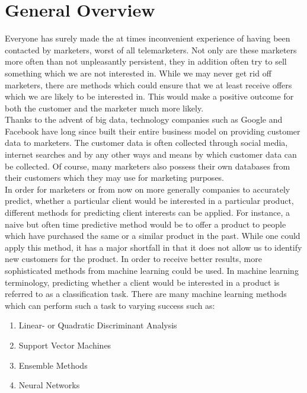 	
	\section{General Overview}

	Everyone has surely made the at times inconvenient experience of having been contacted by marketers, worst of all telemarketers. Not only are these
	marketers more often than not unpleasantly persistent, they in addition often try to sell something which we are not interested in. While we may 
	never get rid off marketers, there are methods which could ensure that we at least receive offers which we are likely to be interested in. This 
	would make a positive outcome for both the customer and the marketer much more likely. \\ 

	\noindent Thanks to the advent of big data, technology companies such as Google and Facebook have long since built their entire business model on 
	providing customer data to marketers. The customer data is often collected through social media, internet searches and by any other ways and means 
	by which customer data can be collected. Of course, many marketers also possess their own databases from their customers which they may use for 
	marketing purposes. \\

	\noindent In order for marketers or from now on more generally companies to accurately predict, whether a particular client would be interested in a	particular product, different methods for predicting client interests can be applied. For instance, a naive but often time predictive method would
	be to offer a product to people which have purchased the same or a similar product in the past. While one could apply this method, it has a major 
	shortfall in that it does not allow us to identify new customers for the product. In order to receive better results, more sophisticated methods 
	from machine learning could be used. In machine learning terminology, predicting whether a client would be interested in a product is referred to 
	as a classification task. There are many machine learning methods which can perform such a task to varying success such as:

	\begin{enumerate}
		\item Linear- or Quadratic Discriminant Analysis
		\item Support Vector Machines
		\item Ensemble Methods
		\item Neural Networks
	\end{enumerate}

